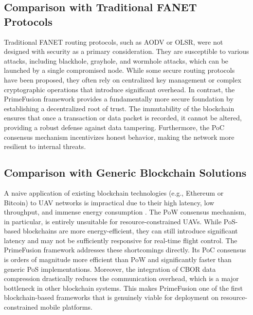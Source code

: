\subsection{Comparison with Traditional FANET Protocols}
Traditional FANET routing protocols, such as AODV or OLSR, were not designed with security as a primary consideration. They are susceptible to various attacks, including blackhole, grayhole, and wormhole attacks, which can be launched by a single compromised node. While some secure routing protocols have been proposed, they often rely on centralized key management or complex cryptographic operations that introduce significant overhead. In contrast, the PrimeFusion framework provides a fundamentally more secure foundation by establishing a decentralized root of trust. The immutability of the blockchain ensures that once a transaction or data packet is recorded, it cannot be altered, providing a robust defense against data tampering. Furthermore, the PoC consensus mechanism incentivizes honest behavior, making the network more resilient to internal threats.

\subsection{Comparison with Generic Blockchain Solutions}
A naive application of existing blockchain technologies (e.g., Ethereum or Bitcoin) to UAV networks is impractical due to their high latency, low throughput, and immense energy consumption \cite{hossain2024blockchain}. The PoW consensus mechanism, in particular, is entirely unsuitable for resource-constrained UAVs. While PoS-based blockchains are more energy-efficient, they can still introduce significant latency and may not be sufficiently responsive for real-time flight control. The PrimeFusion framework addresses these shortcomings directly. Its PoC consensus is orders of magnitude more efficient than PoW and significantly faster than generic PoS implementations. Moreover, the integration of CBOR data compression drastically reduces the communication overhead, which is a major bottleneck in other blockchain systems. This makes PrimeFusion one of the first blockchain-based frameworks that is genuinely viable for deployment on resource-constrained mobile platforms.

